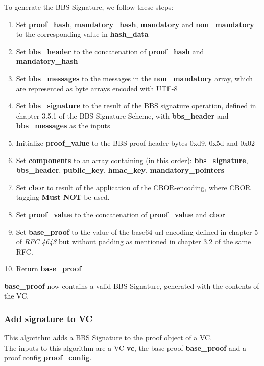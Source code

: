 \documentclass[
	a4paper               %
	,BCOR=0mm            %
	,bibliography=totoc   %
	,listof=totoc         %
	,monolingual
	,twoside=false
]{bfhthesis}              %
\begin{document}
To generate the BBS Signature, we follow these steps:
\begin{enumerate}
	\item Set \textbf{proof\_hash}, \textbf{mandatory\_hash}, \textbf{mandatory} and \textbf{non\_mandatory} to the corresponding value in \textbf{hash\_data}
	\item Set \textbf{bbs\_header} to the concatenation of \textbf{proof\_hash} and \textbf{mandatory\_hash}
	\item Set \textbf{bbs\_messages} to the messages in the \textbf{non\_mandatory} array, which are represented as byte arrays encoded with UTF-8
	\item Set \textbf{bbs\_signature} to the result of the BBS signature operation, defined in chapter 3.5.1 of the BBS Signature Scheme\cite{bbs-signature-scheme}, with \textbf{bbs\_header} and \textbf{bbs\_messages} as the inputs
	\item Initialize \textbf{proof\_value} to the BBS proof header bytes 0xd9, 0x5d and 0x02
	\item Set \textbf{components} to an array containing (in this order): \textbf{bbs\_signature}, \textbf{bbs\_header}, \textbf{public\_key}, \textbf{hmac\_key}, \textbf{mandatory\_pointers}
	\item Set \textbf{cbor} to result of the application of the CBOR-encoding\cite{cbor}, where CBOR tagging \textbf{Must NOT} be used.
	\item Set \textbf{proof\_value} to the concatenation of \textbf{proof\_value} and \textbf{cbor}
	\item Set \textbf{base\_proof} to the value of the base64-url encoding defined in chapter 5 of \textit{RFC 4648}\cite{base64} but without padding as mentioned in chapter 3.2 of the same RFC.
	\item Return \textbf{base\_proof}
\end{enumerate}

\textbf{base\_proof} now contains a valid BBS Signature, generated with the contents of the VC.

\subsubsection{Add signature to VC}
\label{subsubsec:addsig}
This algorithm adds a BBS Signature to the proof object of a VC.\\

The inputs to this algorithm are a VC \textbf{vc}, the base proof \textbf{base\_proof} and a proof config \textbf{proof\_config}.\\
\end{document}

